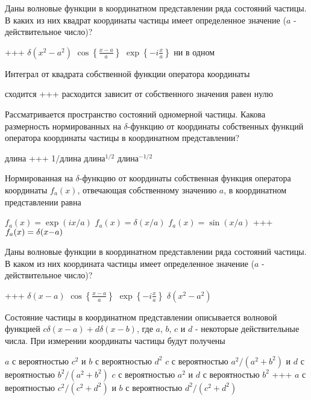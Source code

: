 \documentclass[11pt,a4paper]{exam}
\newcommand{\rightchoice}{\choice +++ }
\begin{document}
\begin{questions}
\question Даны волновые функции в координатном представлении ряда состояний частицы. В каких из них квадрат координаты частицы имеет определенное значение ($a$ - действительное число)?
\begin{choices}
\rightchoice $\delta ({x^2} - {a^2})$    
\choice $\cos \left\{ {\frac{{x - a}}{a}} \right\}$         
\choice $\exp \left\{ { - i\frac{x}{a}} \right\}$        
\choice ни в одном
\end{choices}

\question Интеграл от квадрата собственной функции оператора координаты
\begin{choices}
\choice сходится              
\rightchoice расходится   
\choice зависит от собственного значения  
\choice равен нулю
\end{choices}

\question Рассматривается пространство состояний одномерной частицы. Какова размерность нормированных на $\delta $-функцию от координаты собственных функций оператора координаты частицы в координатном представлении?
\begin{choices}
\choice длина
\rightchoice 1/длина
\choice длина$^{1/2}$
\choice длина$^{-1/2}$
\end{choices}

\question Нормированная на $\delta$-функцию от координаты собственная функция оператора координаты ${f_a}(x)$, отвечающая собственному значению $a$, в координатном представлении равна
\begin{choices}
\choice ${f_a}(x) = \exp (ix/a)$       
\choice ${f_a}(x) = \delta (x/a)$
\choice ${f_a}(x) = \sin (x/a)$     
\rightchoice ${f_a}(x) = \delta (x{\rm{ - }}a)$
\end{choices}

\question Даны волновые функции в координатном представлении ряда состояний частицы. В каком из них координата частицы имеет определенное значение ($a$ - действительное число)?
\begin{choices}
\rightchoice $\delta (x - a)$      
\choice $\cos \left\{ {\frac{{x - a}}{a}} \right\}$         
\choice $\exp \left\{ { - i\frac{x}{a}} \right\}$        
\choice $\delta ({x^2} - {a^2})$ 
\end{choices}

\question Состояние частицы в координатном представлении описывается волновой функцией $c\delta (x - a) + d\delta (x - b)$, где $a$, $b$, $c$ и $d$ - некоторые действительные числа. При измерении координаты частицы будут получены
\begin{choices}
\choice $a$ с вероятностью ${c^2}$ и $b$ с вероятностью ${d^2}$
\choice $c$ с вероятностью ${a^2}/({a^2} + {b^2})$ и $d$ с вероятностью ${b^2}/({a^2} + {b^2})$
\choice $c$ с вероятностью ${a^2}$ и $d$ с вероятностью ${b^2}$
\rightchoice $a$ с вероятностью ${c^2}/({c^2} + {d^2})$ и $b$ с вероятностью ${d^2}/({c^2} + {d^2})$ 
\end{choices}


\end{questions}
\end{document}

